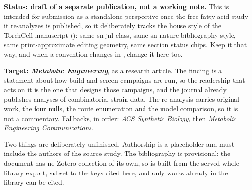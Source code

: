 
\clearpage

{\small\color{gray}\noindent
\textbf{Status: draft of a separate publication, not a working note.} This is intended for
submission as a standalone perspective once the free fatty acid study it re-analyzes is
published, so it deliberately tracks the house style of the TorchCell manuscript
(): same sn-jnl class, same sn-nature bibliography
style, same print-approximate editing geometry, same section status chips. Keep it that way,
and when a convention changes in , change it here too.
\par\smallskip
\textbf{Target: \emph{Metabolic Engineering}}, as a research article. The finding is a
statement about how build-and-screen campaigns are run, so the readership that acts on it
is the one that designs those campaigns, and the journal already publishes analyses of
combinatorial strain data. The re-analysis carries original work, the four nulls, the route
enumeration and the model comparison, so it is not a commentary. Fallbacks, in order:
\emph{ACS Synthetic Biology}, then \emph{Metabolic Engineering Communications}.
\par\smallskip
Two things are deliberately unfinished. Authorship is a placeholder and must include the
authors of the source study. The bibliography is provisional: the document has no Zotero
collection of its own, so  is built from the served whole-library
export, subset to the keys cited here, and only works already in the library can be cited.
\par}

\vspace{1em}
\papertoc
\clearpage






\clearpage

